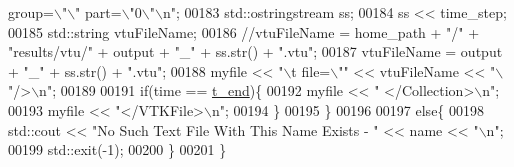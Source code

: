 \begin{DoxyCode}
{       group=\(\backslash\)"\(\backslash\)" part=\(\backslash\)"0\(\backslash\)"\(\backslash\)n"};
00183         std::ostringstream ss;
00184         ss << time\_step;
00185         std::string vtuFileName;
00186         \textcolor{comment}{//vtuFileName = home\_path + "/" + "results/vtu/" + output + "\_" + ss.str() + ".vtu";}
00187     vtuFileName = output + \textcolor{stringliteral}{"\_"} + ss.str() + \textcolor{stringliteral}{".vtu"};
00188         myfile << \textcolor{stringliteral}{"\(\backslash\)t      file=\(\backslash\)""} << vtuFileName << \textcolor{stringliteral}{"\(\backslash\)"/>\(\backslash\)n"};
00189 
00191         \textcolor{keywordflow}{if}(time == \hyperlink{_global_variables_8h_a4b637c5fff609e604a3b2b2787f4a9fa}{t\_end})\{
00192         myfile << \textcolor{stringliteral}{"   </Collection>\(\backslash\)n"};
00193         myfile << \textcolor{stringliteral}{"</VTKFile>\(\backslash\)n"};
00194         \}
00195     \}
00196 
00197     \textcolor{keywordflow}{else}\{
00198         std::cout << \textcolor{stringliteral}{"No Such Text File With This Name Exists - "} << name << \textcolor{stringliteral}{"\(\backslash\)n"};
00199         std::exit(-1);
00200     \}
00201 \}
\end{DoxyCode}
